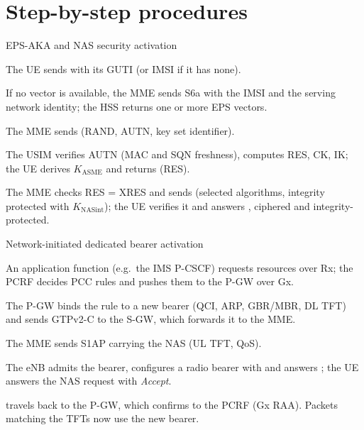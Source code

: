 \documentclass[11pt,a4paper]{article}
\begin{document}
\section{Step-by-step procedures}

\begin{procedurebox}{EPS-AKA and NAS security activation}\label{proc:aka}
\begin{steps}
  \item The UE sends  with its GUTI (or IMSI if it has none).
  \item If no vector is available, the MME sends S6a  with the
        IMSI and the serving network identity; the HSS returns one or more EPS vectors.
  \item The MME sends  (RAND, AUTN, key set identifier).
  \item The USIM verifies AUTN (MAC and SQN freshness), computes RES, CK, IK; the UE derives
        $K_{\mathrm{ASME}}$ and returns  (RES).
  \item The MME checks RES = XRES and sends  (selected algorithms, integrity
        protected with $K_{\mathrm{NASint}}$); the UE verifies it and answers ,
        ciphered and integrity-protected.
\end{steps}
\end{procedurebox}

\begin{acnfigure}
  \caption{EPS-AKA and NAS security mode (\cref{proc:aka}).}
  \label{fig:aka}
\end{acnfigure}

\begin{procedurebox}{Network-initiated dedicated bearer activation}\label{proc:ded}
\begin{steps}
  \item An application function (e.g.\ the IMS P-CSCF) requests resources over Rx; the PCRF decides
        PCC rules and pushes them to the P-GW over Gx.
  \item The P-GW binds the rule to a new bearer (QCI, ARP, GBR/MBR, DL TFT) and sends GTPv2-C
         to the S-GW, which forwards it to the MME.
  \item The MME sends S1AP  carrying the NAS  (UL TFT, QoS).
  \item The eNB admits the bearer, configures a radio bearer with  and
        answers ; the UE answers the NAS request with \emph{Accept}.
  \item {} travels back to the P-GW, which confirms to the PCRF (Gx RAA). Packets
        matching the TFTs now use the new bearer.
\end{steps}
\end{procedurebox}
\end{document}
